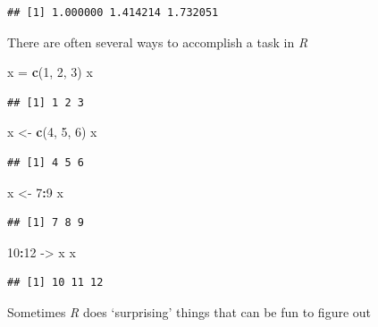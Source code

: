\documentclass[]{article}
\newenvironment{Shaded}{\begin{snugshade}}{\end{snugshade}}
\newcommand{\KeywordTok}[1]{\textcolor[rgb]{0.13,0.29,0.53}{\textbf{#1}}}
\newcommand{\DecValTok}[1]{\textcolor[rgb]{0.00,0.00,0.81}{#1}}
\newcommand{\StringTok}[1]{\textcolor[rgb]{0.31,0.60,0.02}{#1}}
\newcommand{\OperatorTok}[1]{\textcolor[rgb]{0.81,0.36,0.00}{\textbf{#1}}}
\newcommand{\NormalTok}[1]{#1}
\theoremstyle{definition}
\theoremstyle{definition}
\theoremstyle{remark}
\begin{document}
\begin{verbatim}
## [1] 1.000000 1.414214 1.732051
\end{verbatim}

There are often several ways to accomplish a task in \emph{R}

\begin{Shaded}
\begin{Highlighting}[]
\NormalTok{x =}\StringTok{ }\KeywordTok{c}\NormalTok{(}\DecValTok{1}\NormalTok{, }\DecValTok{2}\NormalTok{, }\DecValTok{3}\NormalTok{)}
\NormalTok{x}
\end{Highlighting}
\end{Shaded}

\begin{verbatim}
## [1] 1 2 3
\end{verbatim}

\begin{Shaded}
\begin{Highlighting}[]
\NormalTok{x <-}\StringTok{ }\KeywordTok{c}\NormalTok{(}\DecValTok{4}\NormalTok{, }\DecValTok{5}\NormalTok{, }\DecValTok{6}\NormalTok{)}
\NormalTok{x}
\end{Highlighting}
\end{Shaded}

\begin{verbatim}
## [1] 4 5 6
\end{verbatim}

\begin{Shaded}
\begin{Highlighting}[]
\NormalTok{x <-}\StringTok{ }\DecValTok{7}\OperatorTok{:}\DecValTok{9}
\NormalTok{x}
\end{Highlighting}
\end{Shaded}

\begin{verbatim}
## [1] 7 8 9
\end{verbatim}

\begin{Shaded}
\begin{Highlighting}[]
\DecValTok{10}\OperatorTok{:}\DecValTok{12}\NormalTok{ ->}\StringTok{ }\NormalTok{x}
\NormalTok{x}
\end{Highlighting}
\end{Shaded}

\begin{verbatim}
## [1] 10 11 12
\end{verbatim}

Sometimes \emph{R} does `surprising' things that can be fun to figure
out
\end{document}
